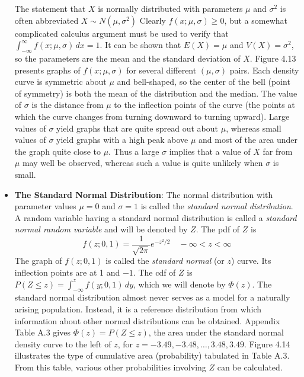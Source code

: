 \documentclass{report}
\begin{document}
\begin{itemize}
        \bigbreak \noindent 
        The statement that $X$ is normally distributed with parameters $\mu$ and $\sigma^{2}$ is often abbreviated $X\sim N(\mu,\sigma^{2})$
        \bigbreak \noindent 
        Clearly \( f(x; \mu, \sigma) \geq 0 \), but a somewhat complicated calculus argument must be used to verify that \( \int_{-\infty}^{\infty} f(x; \mu, \sigma) \, dx = 1 \). It can be shown that \( E(X) = \mu \) and \( V(X) = \sigma^2 \), so the parameters are the mean and the standard deviation of \( X \). Figure 4.13 presents graphs of \( f(x; \mu, \sigma) \) for several different \((\mu, \sigma)\) pairs. Each density curve is symmetric about \( \mu \) and bell-shaped, so the center of the bell (point of symmetry) is both the mean of the distribution and the median. The value of \( \sigma \) is the distance from \( \mu \) to the inflection points of the curve (the points at which the curve changes from turning downward to turning upward). Large values of \( \sigma \) yield graphs that are quite spread out about \( \mu \), whereas small values of \( \sigma \) yield graphs with a high peak above \( \mu \) and most of the area under the graph quite close to \( \mu \). Thus a large \( \sigma \) implies that a value of \( X \) far from \( \mu \) may well be observed, whereas such a value is quite unlikely when \( \sigma \) is small.
        \bigbreak \noindent 
        \bigbreak \noindent 
    \item \textbf{The Standard Normal Distribution}:
        The normal distribution with parameter values \( \mu = 0 \) and \( \sigma = 1 \) is called the \textit{standard normal distribution}. A random variable having a standard normal distribution is called a \textit{standard normal random variable} and will be denoted by \( Z \). The pdf of \( Z \) is
        \[
            f(z; 0, 1) = \frac{1}{\sqrt{2\pi}} e^{-z^2/2} \quad -\infty < z < \infty
        \]
        \bigbreak \noindent 
        The graph of \( f(z; 0, 1) \) is called the \textit{standard normal} (or \( z \)) curve. Its inflection points are at 1 and \(-1\). The cdf of \( Z \) is \( P(Z \leq z) = \int_{-\infty}^{z} f(y; 0, 1) \, dy \), which we will denote by \( \Phi(z) \).
        \bigbreak \noindent 
        \bigbreak \noindent 
        The standard normal distribution almost never serves as a model for a naturally arising population. Instead, it is a reference distribution from which information about other normal distributions can be obtained. Appendix Table A.3 gives \( \Phi(z) = P(Z \leq z) \), the area under the standard normal density curve to the left of \( z \), for \( z = -3.49, -3.48, \ldots, 3.48, 3.49 \). Figure 4.14 illustrates the type of cumulative area (probability) tabulated in Table A.3. From this table, various other probabilities involving \( Z \) can be calculated.

\end{itemize}
\end{document}
